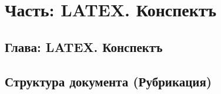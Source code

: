 





\tableofcontents

\part{Часть: LATEX. Конспектъ}
\chapter{Глава: LATEX. Конспектъ}





\chapter{Структура документа (Рубрикация)}








\appendix






